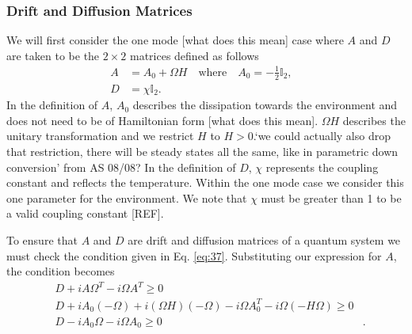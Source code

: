 \documentclass[11pt,a4paper]{article}
\numberwithin{equation}{section}
\begin{document}
	\subsubsection{Drift and Diffusion Matrices}
	\label{sec:onemodedefs}
	We will first consider the one mode \color{blue}[what does this mean] \color{black}case where $A$ and $D$ are taken to be the $2 \times 2$ matrices defined as follows
	\begin{align*}
	A &= A_0 + \Omega H \quad\text{where}\quad A_0 = -\frac{1}{2}\mathbb{I}_2,&\\
	D &= \chi \mathbb{I}_2.&
	\end{align*}
	In the definition of $A$, $A_0$ describes the dissipation towards the environment and does not need to be of Hamiltonian form \color{blue}[what does this mean]\color{black}. $\Omega H$ describes the unitary transformation and we restrict $H$ to $H>0$.\color{blue}`we could actually also drop that restriction, there will be steady states all the same, like in parametric down conversion' from AS 08/08? \color{black} In the definition of $D$, $\chi$ represents the coupling constant and reflects the temperature. Within the one mode case we consider this one parameter for the environment. \color{red}We note that $\chi$ must be greater than 1 to be a valid coupling constant [REF]. \color{black} 
	
	To ensure that $A$ and $D$ are drift and diffusion matrices of a quantum system we must check the condition given in Eq. \ref{eq:37}. Substituting our expression for $A$, the condition becomes
	\begin{align} 
	&D + iA \Omega^T - i\Omega A^T \geq 0& \nonumber\\
	&D + iA_0 (-\Omega) + i (\Omega H) (-\Omega) - i\Omega A_{0}^{T} - i\Omega (-H\Omega) \geq 0& \nonumber\\
	&D - iA_0 \Omega - i\Omega A_0 \geq 0& \label{eq:42}.
	\end{align}
	
\end{document}
